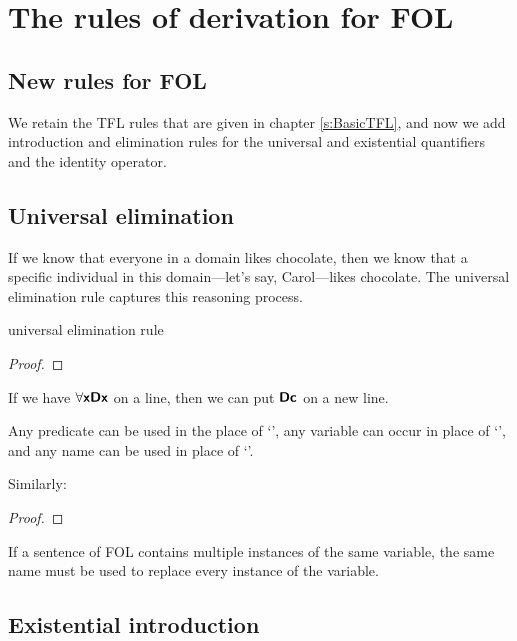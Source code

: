 \graphicspath{{figures--FOL/}}

\chapter{The rules of derivation for FOL}\label{FOL-rules}

\section{New rules for FOL}

We retain the TFL rules that are given in chapter \ref{s:BasicTFL}, and now we add introduction and elimination rules for the universal and existential quantifiers and the identity operator.

\section{Universal elimination}

If we know that everyone in a domain likes chocolate, then we know that a specific individual in this domain---let's say, Carol---likes chocolate. The universal elimination rule captures this reasoning process. 

\begin{factboxy}{universal elimination rule}
\begin{proof}
	 
\end{proof}

\small{If we have $\forall \bm{\mathsf{x Dx}}$ on a line, then we can put $\bm{\mathsf{Dc}}$ on a new line.
\smallskip

Any predicate can  be used in the place of `', any variable can occur in place of `', and any name can be used in place of `'.
\smallskip

Similarly:}

\begin{proof}
	 
\end{proof}

\small{If a sentence of FOL contains multiple instances of the same variable, the same name must be used to replace every instance of the variable.}

\end{factboxy}


\section{Existential introduction}

